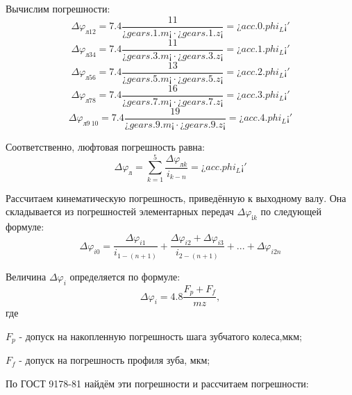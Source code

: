 \documentclass[14pt,a4paper,russian]{scrartcl}
\begin{document}
        Вычислим погрешности:
        \[ \Delta\varphi_{\text{л}12} = 7.4\frac{11}{¿gears.1.m¡\cdot ¿gears.1.z¡} = ¿acc.0.phi_L¡' \]
        \[ \Delta\varphi_{\text{л}34} = 7.4\frac{11}{¿gears.3.m¡\cdot ¿gears.3.z¡} = ¿acc.1.phi_L¡' \]
        \[ \Delta\varphi_{\text{л}56} = 7.4\frac{13}{¿gears.5.m¡\cdot ¿gears.5.z¡} = ¿acc.2.phi_L¡' \]
        \[ \Delta\varphi_{\text{л}78} = 7.4\frac{16}{¿gears.7.m¡\cdot ¿gears.7.z¡} = ¿acc.3.phi_L¡' \]
        \[ \Delta\varphi_{\text{л}9\ 10} = 7.4\frac{19}{¿gears.9.m¡\cdot ¿gears.9.z¡} = ¿acc.4.phi_L¡' \]
        
        Соответственно, люфтовая погрешность равна:
        \[ \Delta\varphi_{\text{л}} = \sum_{k=1}^{5}\frac{\Delta\varphi_{\text{л}k}}{i_{k-n}} = ¿acc.phi_L¡'\]
        
        Рассчитаем кинематическую погрешность, приведённую к выходному валу. Она складывается из погрешностей
        элементарных передач \( \Delta\varphi_{\text{i}k} \) по следующей формуле:
        \[ \Delta\varphi_{i0} = \frac{\Delta\varphi_{i1}}{i_{1-(n+1)}} +  
        \frac{\Delta\varphi_{i2}+\Delta\varphi_{i3}}{i_{2-(n+1)}} + ... + \Delta\varphi_{i2n} \]

        Величина \( \Delta\varphi_{i} \) определяется по формуле:
        \[ \Delta\varphi_{i} = 4.8\frac{F_p+F_f}{mz}, \]
        где\par
            \qquad\( F_p \) - допуск на накопленную погрешность шага зубчатого колеса,мкм;\par
            \qquad\( F_f \) - допуск на погрешность профиля зуба, мкм;\par
        
        По ГОСТ 9178-81 найдём эти погрешности и рассчитаем погрешности:
        
\end{document}
